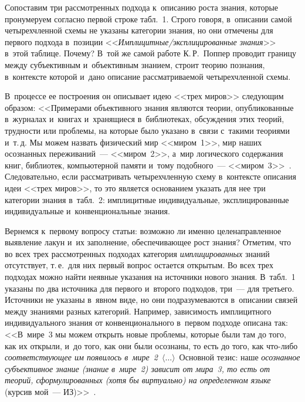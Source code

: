 \begin{multicols}{2}
  
  Сопоставим три рассмотренных подхода к~описанию роста знания, которые 
пронумеруем согласно первой строке табл.~1. Строго говоря, в~описании самой 
четырехчленной схемы не указаны категории знания, но они отмечены для 
первого подхода в~позиции  
<<\textit{Им\-пли\-цит\-ные/экс\-пли\-ци\-ро\-ван\-ные знания}>> в~этой 
таблице. Почему? В~той же самой работе К.\,Р.~Поппер проводит границу 
между субъективным и~объективным знанием, строит теорию познания, 
в~контексте которой и~дано описание рассматриваемой четырехчленной схемы. 
  
  

  В~процессе ее построения он описывает идею <<трех миров>> следующим 
образом: <<Примерами объективного знания являются теории, 
опубликованные в~журналах и~книгах и~хранящиеся в~биб\-лио\-те\-ках, обсуждения 
этих теорий, трудности или проблемы, на которые было указано в~связи 
с~такими теориями и~т.\,д. Мы можем назвать физический мир <<миром~1>>, 
мир наших осознанных переживаний~--- <<миром~2>>, а~мир логического 
содержания книг, библиотек, компьютерной памяти и~тому подобного~--- 
<<миром~3>>~\cite[с.~78]{1-zat}. Следовательно, если рассматривать 
четырехчленную схему в~контексте описания идеи <<трех миров>>, то это 
является основанием указать для нее три категории знания в~табл.~2: 
имплицитные индивидуальные, эксплицированные индивидуальные 
и~конвенциональные знания.
  
  Вернемся к~первому вопросу статьи: возможно ли именно целенаправленное 
выявление лакун и~их заполнение, обеспечивающее рост знания? Отметим, что 
во всех трех рассмотренных подходах категория \textit{имплицированных} 
знаний отсутствует, т.\,е.\ для них первый вопрос остается открытым. Во всех 
трех подходах можно найти неявные указания на источники нового знания. 
В~табл.~1 указаны по два источника для первого и~второго подходов, три~--- 
для третьего. Источники не указаны в~явном виде, но они подразумеваются 
в~описании связей между знаниями разных категорий. Например, зависимость 
имплицитного индивидуального знания от конвенционального в~первом 
подходе описана так: <<В~мире~3 мы можем открыть новые проблемы, 
которые были там до того, как их открыли, и~до того, как они были осознаны, 
то есть до того, как что-ли\-бо \textit{соответствующее им появилось 
в~мире~2}~$\langle\ldots\rangle$\ Основной тезис: наше \textit{осознанное 
субъективное знание (знание в~мире~2) зависит от мира~3, то есть от 
теорий, сформулированных (хотя бы виртуально) на определенном языке} 
(курсив мой~--- ИЗ)>>~\cite[с.~78]{1-zat}.
  

\end{multicols}
